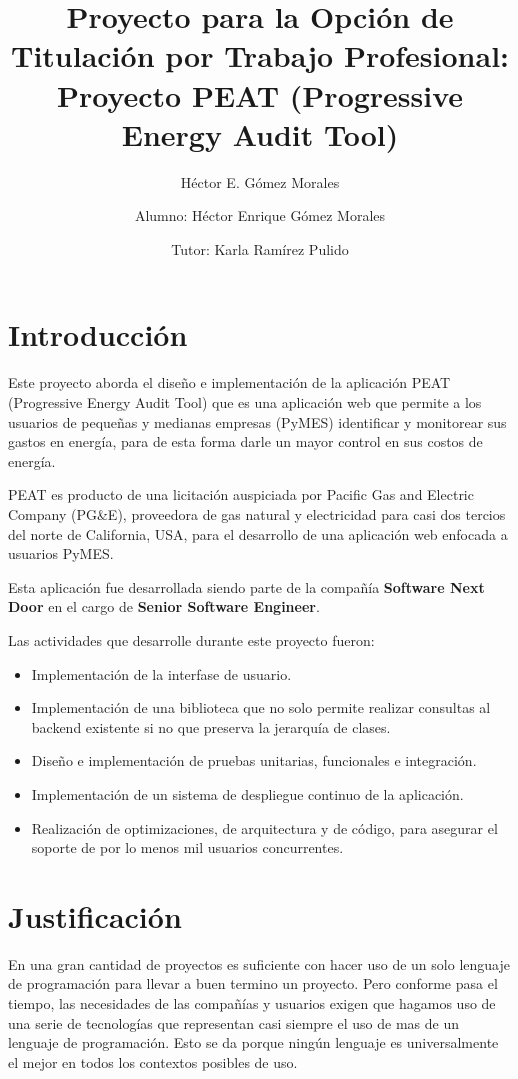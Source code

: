 \documentclass{article}
\author{Héctor E. Gómez Morales}
\title{Proyecto para la Opción de Titulación por Trabajo Profesional: \\
  Proyecto PEAT (Progressive Energy Audit Tool)}
\begin{document}
\author{ Alumno: Héctor Enrique Gómez Morales \and
  Tutor: Karla Ramírez Pulido}
\maketitle
\section{Introducción}
Este proyecto aborda el diseño e implementación de la aplicación
PEAT (Progressive Energy Audit Tool) que es una aplicación web que
permite a los usuarios de pequeñas y medianas empresas (PyMES)
identificar y monitorear sus gastos en energía, para de esta forma
darle un mayor control en sus costos de energía.

PEAT es producto de una licitación auspiciada por Pacific Gas and
Electric Company (PG\&E), proveedora de gas natural y electricidad
para casi dos tercios del norte de California, USA, para
el desarrollo de una aplicación web enfocada a usuarios PyMES.

Esta aplicación fue desarrollada siendo parte de la compañía
\textbf{Software Next Door} en el cargo de \textbf{Senior Software Engineer}.

Las actividades que desarrolle durante este proyecto fueron:
\begin{itemize}
\item Implementación de la interfase de usuario.
\item Implementación de una biblioteca que no solo permite realizar consultas
  al backend existente si no que preserva la jerarquía de clases.
\item Diseño e implementación de pruebas unitarias, funcionales e integración.
\item Implementación de un sistema de despliegue continuo de la aplicación.
\item Realización de optimizaciones, de arquitectura y de código,
  para asegurar el soporte de por lo menos mil usuarios concurrentes.
\end{itemize}

\section{Justificación}
En una gran cantidad de proyectos es suficiente
con hacer uso de un solo lenguaje de programación para llevar a buen
termino un proyecto. Pero conforme pasa el tiempo, las necesidades
de las compañías y usuarios exigen que hagamos uso de una serie de
tecnologías que representan casi siempre el uso de mas de un lenguaje
de programación. Esto se da porque ningún lenguaje es universalmente
el mejor en todos los contextos posibles de uso.
\end{document}
